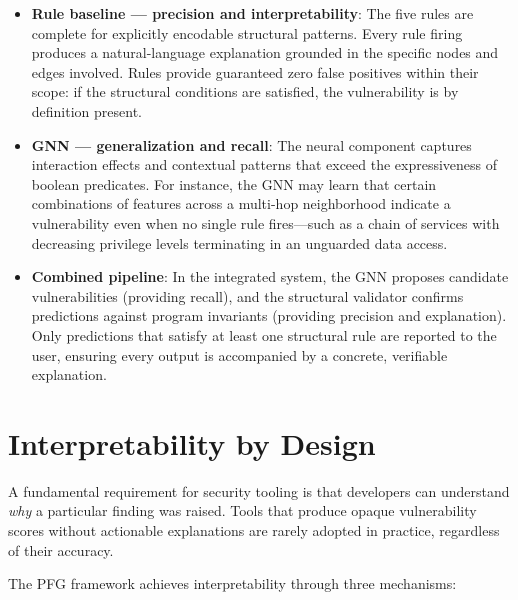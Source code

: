 \begin{itemize}
    \item \textbf{Rule baseline — precision and interpretability}: The five rules are complete for explicitly encodable structural patterns. Every rule firing produces a natural-language explanation grounded in the specific nodes and edges involved. Rules provide guaranteed zero false positives within their scope: if the structural conditions are satisfied, the vulnerability is by definition present.

    \item \textbf{GNN — generalization and recall}: The neural component captures interaction effects and contextual patterns that exceed the expressiveness of boolean predicates. For instance, the GNN may learn that certain combinations of features across a multi-hop neighborhood indicate a vulnerability even when no single rule fires—such as a chain of services with decreasing privilege levels terminating in an unguarded data access.

    \item \textbf{Combined pipeline}: In the integrated system, the GNN proposes candidate vulnerabilities (providing recall), and the structural validator confirms predictions against program invariants (providing precision and explanation). Only predictions that satisfy at least one structural rule are reported to the user, ensuring every output is accompanied by a concrete, verifiable explanation.
\end{itemize}

\section{Interpretability by Design}
\label{sec:interpretability}

A fundamental requirement for security tooling is that developers can understand \emph{why} a particular finding was raised. Tools that produce opaque vulnerability scores without actionable explanations are rarely adopted in practice, regardless of their accuracy.

The PFG framework achieves interpretability through three mechanisms:

